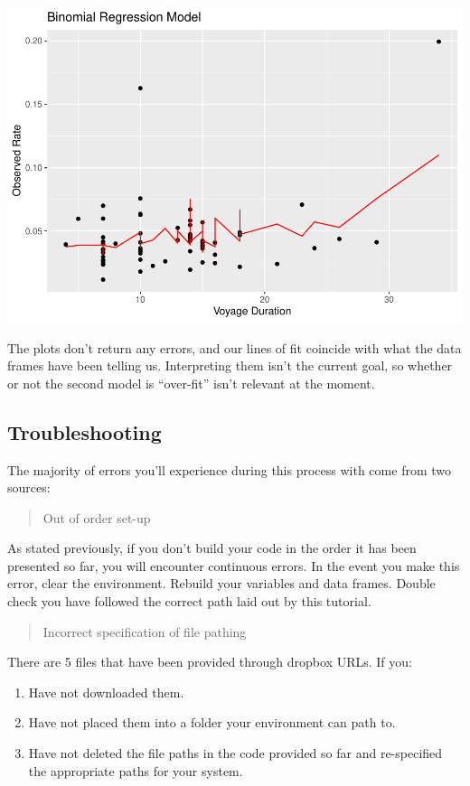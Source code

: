 \documentclass[
  11,
]{book}
\begin{document}
\includegraphics{_main_files/figure-latex/predm2_plot2-1.pdf}

The plots don't return any errors, and our lines of fit coincide with what the data frames have been telling us. Interpreting them isn't the current goal, so whether or not the second model is ``over-fit'' isn't relevant at the moment.

\hypertarget{troubleshooting}{%
\subsection*{Troubleshooting}\label{troubleshooting}}


The majority of errors you'll experience during this process with come from two sources:

\begin{quote}
Out of order set-up
\end{quote}

As stated previously, if you don't build your code in the order it has been presented so far, you will encounter continuous errors. In the event you make this error, clear the environment. Rebuild your variables and data frames. Double check you have followed the correct path laid out by this tutorial.

\begin{quote}
Incorrect specification of file pathing
\end{quote}

There are 5 files that have been provided through dropbox URLs. If you:

\begin{enumerate}
\def\labelenumi{\arabic{enumi})}
\item
  Have not downloaded them.
\item
  Have not placed them into a folder your environment can path to.
\item
  Have not deleted the file paths in the code provided so far and re-specified the appropriate paths for your system.
\end{enumerate}
\end{document}
